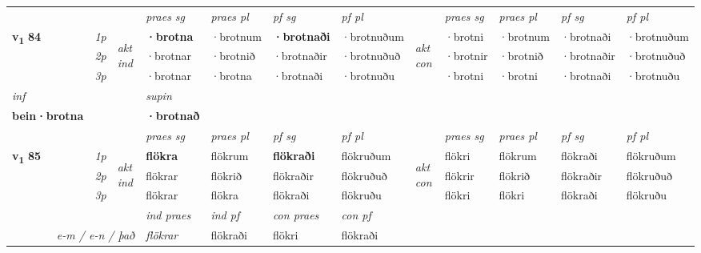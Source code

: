 \begin{longtable}[l]{X>{\footnotesize\itshape}llXXXXlXXXX}
 & &   & \textit{praes sg}  & \textit{praes pl}    & \textit{ pf sg} & \textit{pf pl} & & \textit{praes sg}  & \textit{praes pl}    & \textit{pf sg} & \textit{pf pl }  \\ \cmidrule{4-7} \cmidrule{9-12}
 \multirow{2}{*}{{{\textbf{v{\textsubscript{1}}} \Large{\textbf{84}}}}}  & 1p & \multirow{3}{*}{\begin{turn}{90}\textit{akt ind}\end{turn}} & \textbf{·brotna} & ·brotnum & \textbf{·brotnaði} & ·brotnuðum & \multirow{3}{*}{\begin{turn}{90}\textit{akt con}\end{turn}} &·brotni & ·brotnum & ·brotnaði & ·brotnuðum\\*
 & 2p &  &  ·brotnar  & ·brotnið & ·brotnaðir & ·brotnuðuð & & ·brotnir & ·brotnið & ·brotnaðir & ·brotnuðuð \\*
 & 3p &  & ·brotnar & ·brotna & ·brotnaði & ·brotnuðu & & ·brotni & ·brotni& ·brotnaði & ·brotnuðu \\*
\cmidrule{4-7} \cmidrule{9-12}

   {\textit{inf}} & &      & \textit{supin}   \\*
  {\textbf{bein\allowbreak ·brotna}} & &      &  \textbf{·brotnað}   \\*

\midrule

 & &   & \textit{praes sg}  & \textit{praes pl}    & \textit{ pf sg} & \textit{pf pl} & & \textit{praes sg}  & \textit{praes pl}    & \textit{pf sg} & \textit{pf pl }  \\ \cmidrule{4-7} \cmidrule{9-12}
 \multirow{2}{*}{{{\textbf{v{\textsubscript{1}}} \Large{\textbf{85}}}}}  & 1p & \multirow{3}{*}{\begin{turn}{90}\textit{akt ind}\end{turn}} & \textbf{flökra} & flökrum & \textbf{flökraði} & flökruðum & \multirow{3}{*}{\begin{turn}{90}\textit{akt con}\end{turn}} &flökri & flökrum & flökraði & flökruðum\\*
 & 2p &  &  flökrar  & flökrið & flökraðir & flökruðuð & & flökrir & flökrið & flökraðir & flökruðuð \\*
 & 3p &  & flökrar & flökra & flökraði & flökruðu & & flökri & flökri& flökraði & flökruðu \\*
\cmidrule{4-7} \cmidrule{9-12}

   && &  \textit{ind praes} & \textit{ind pf} & \textit{con praes} & \textit{con pf} \\*
\multicolumn{3}{r}{\textit{e-m  /  e-n / það}} & flökrar & flökraði & flökri & flökraði \\*


\end{longtable}

